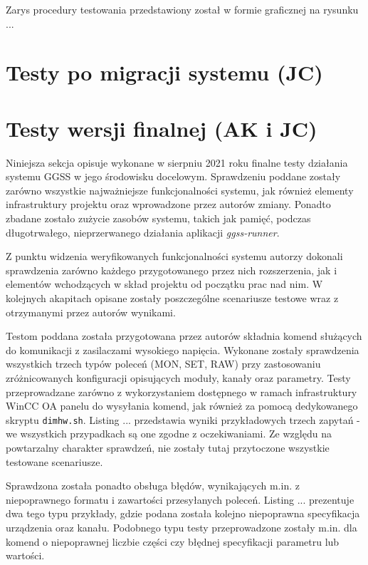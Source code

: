  Zarys procedury testowania przedstawiony został w formie graficznej na rysunku ... 


\section{Testy po migracji systemu (JC)}

\section{Testy wersji finalnej (AK i JC)}
Niniejsza sekcja opisuje wykonane w sierpniu 2021 roku finalne testy działania systemu GGSS w jego środowisku docelowym. Sprawdzeniu poddane zostały zarówno wszystkie najważniejsze funkcjonalności systemu, jak również elementy infrastruktury projektu oraz wprowadzone przez autorów zmiany. Ponadto zbadane zostało zużycie zasobów systemu, takich jak pamięć, podczas długotrwałego, nieprzerwanego działania aplikacji \emph{ggss-runner}. 

Z punktu widzenia weryfikowanych funkcjonalności systemu autorzy dokonali sprawdzenia zarówno każdego przygotowanego przez nich rozszerzenia, jak i elementów wchodzących w skład projektu od początku prac nad nim. W kolejnych akapitach opisane zostały poszczególne scenariusze testowe wraz z otrzymanymi przez autorów wynikami.

Testom poddana została przygotowana przez autorów składnia komend służących do komunikacji z zasilaczami wysokiego napięcia. Wykonane zostały sprawdzenia wszystkich trzech typów poleceń (MON, SET, RAW) przy zastosowaniu zróżnicowanych konfiguracji opisujących moduły, kanały oraz parametry. Testy przeprowadzane zarówno z wykorzystaniem dostępnego w ramach infrastruktury WinCC OA panelu do wysyłania komend, jak również za pomocą dedykowanego skryptu \lstinline{dimhw.sh}. Listing ... przedstawia wyniki przykładowych trzech zapytań - we wszystkich przypadkach są one zgodne z oczekiwaniami. Ze względu na powtarzalny charakter sprawdzeń, nie zostały tutaj przytoczone wszystkie testowane scenariusze. 



Sprawdzona została ponadto obsługa błędów, wynikających m.in. z niepoprawnego formatu i zawartości przesyłanych poleceń. Listing ... prezentuje dwa tego typu przykłady, gdzie podana została kolejno niepoprawna specyfikacja urządzenia oraz kanału. Podobnego typu testy przeprowadzone zostały m.in. dla komend o niepoprawnej liczbie części czy błędnej specyfikacji parametru lub wartości. 

